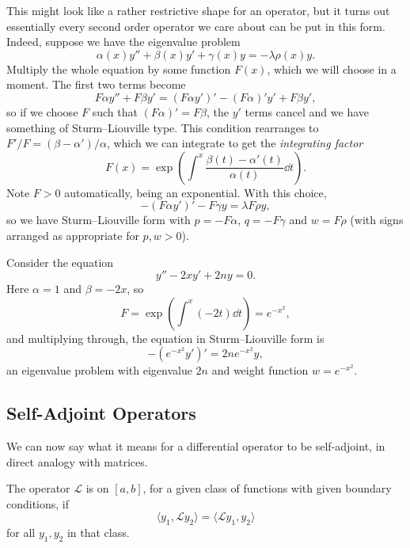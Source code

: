 \documentclass[a4paper]{scrartcl}
\begin{document}
This might look like a rather restrictive shape for an operator, but it turns out essentially every second order operator we care about can be put in this form.
Indeed, suppose we have the eigenvalue problem
$$
\alpha(x) y'' + \beta(x) y' + \gamma(x) y = -\lambda \rho(x) y.
$$
Multiply the whole equation by some function $F(x)$, which we will choose in a moment. The first two terms become
$$
F \alpha y'' + F \beta y' = (F \alpha y')' - (F\alpha)' y' + F \beta y',
$$
so if we choose $F$ such that $(F \alpha)' = F \beta$, the $y'$ terms cancel and we have something of Sturm--Liouville type.
This condition rearranges to $F'/F = (\beta - \alpha')/\alpha$, which we can integrate to get the \emph{integrating factor}
$$
F(x) = \exp\left(\int^x \frac{\beta(t) - \alpha'(t)}{\alpha(t)} \dd t\right).
$$
Note $F > 0$ automatically, being an exponential. With this choice,
$$
-(F \alpha y')' - F \gamma y = \lambda F \rho y,
$$
so we have Sturm--Liouville form with $p = -F\alpha$, $q = -F \gamma$ and $w = F \rho$ (with signs arranged as appropriate for $p, w > 0$).

\begin{example}
    Consider the equation
    $$
    y'' - 2x y' + 2n y = 0.
    $$
    Here $\alpha = 1$ and $\beta = -2x$, so
    $$
    F = \exp \left(\int^x (-2t) \dd t\right) = e^{-x^2},
    $$
    and multiplying through, the equation in Sturm--Liouville form is
    $$
    -\left(e^{-x^2} y'\right)' = 2n e^{-x^2} y,
    $$
    an eigenvalue problem with eigenvalue $2n$ and weight function $w = e^{-x^2}$.
\end{example}

\subsection{Self-Adjoint Operators}

We can now say what it means for a differential operator to be self-adjoint, in direct analogy with matrices.

\begin{definition}
    The operator $\mathcal{L}$ is  on $[a, b]$, for a given class of functions with given boundary conditions, if
    $$
    \langle y_1, \mathcal{L} y_2 \rangle = \langle \mathcal{L} y_1, y_2\rangle
    $$
    for all $y_1, y_2$ in that class.
\end{definition}
\end{document}
